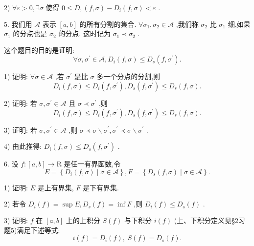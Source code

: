 2) $\forall \varepsilon  > 0,\exists \sigma$ 使得 $0 \leq  D,\left( {f,\sigma }\right)  - {D}_{i}\left( {f,\sigma }\right)  < \varepsilon$ .

5. 我们用 $\mathcal{A}$ 表示 $\left\lbrack  {a,b}\right\rbrack$ 的所有分割的集合. $\forall {\sigma }_{1},{\sigma }_{2} \in  \mathcal{A}$ ,我们称 ${\sigma }_{2}$ 比 ${\sigma }_{1}$ 细,如果 ${\sigma }_{1}$ 的分点也是 ${\sigma }_{2}$ 的分点. 这时记为 ${\sigma }_{1} \prec  {\sigma }_{2}$ .

这个题目的目的是证明:
$$\forall \sigma ,{\sigma }^{\prime } \in  \mathcal{A},{D}_{i}\left( {f,\sigma }\right)  \leq  {D}_{s}\left( {f,{\sigma }^{\prime }}\right) .$$

1) 证明: $\forall \sigma  \in  \mathcal{A}$ ,若 ${\sigma }^{\prime }$ 是比 $\sigma$ 多一个分点的分割,则
$${D}_{i}\left( {f,\sigma }\right)  \leq  {D}_{i}\left( {f,{\sigma }^{\prime }}\right) ,{D}_{s}\left( {f,{\sigma }^{\prime }}\right)  \leq  {D}_{s}\left( {f,\sigma }\right) .$$

2) 证明: 若 $\sigma ,{\sigma }^{\prime } \in  \mathcal{A}$ 且 $\sigma  \prec  {\sigma }^{\prime }$ ,则
$${D}_{i}\left( {f,\sigma }\right)  \leq  {D}_{i}\left( {f,{\sigma }^{\prime }}\right) ,{D}_{s}\left( {f,{\sigma }^{\prime }}\right)  \leq  {D}_{s}\left( {f,\sigma }\right) .$$

3) 证明: 若 $\sigma ,{\sigma }^{\prime } \in  \mathcal{A}$ ,则 $\sigma  \prec  \sigma  \smallsetminus  {\sigma }^{\prime },{\sigma }^{\prime } \prec  \sigma  \smallsetminus  {\sigma }^{\prime }$ .

4) 由此推得: ${D}_{i}\left( {f,\sigma }\right)  \leq  {D}_{s}\left( {f,{\sigma }^{\prime }}\right)$ .

6. 设 $f : \left\lbrack  {a,b}\right\rbrack   \rightarrow  \mathrm{R}$ 是任一有界函数,令
$$E = \left\{  {{D}_{i}\left( {f,\sigma }\right)  \mid  \sigma  \in  \mathcal{A}}\right\}  ,F = \left\{  {{D}_{s}\left( {f,\sigma }\right)  \mid  \sigma  \in  \mathcal{A}}\right\}  .$$

1) 证明: $E$ 是上有界集, $F$ 是下有界集.

2) 若令 ${D}_{i}\left( f\right)  = \sup E,{D}_{s}\left( f\right)  = \inf F$ ,则 ${D}_{i}\left( f\right)  \leq  {D}_{s}\left( f\right)$ .

3) 证明: $f$ 在 $\left\lbrack  {a,b}\right\rbrack$ 上的上积分 $S\left( f\right)$ 与下积分 $i\left( f\right)$ (上、下积分定义见§2习题5)满足下述等式:
$$i\left( f\right)  = {D}_{i}\left( f\right) ,\;S\left( f\right)  = {D}_{s}\left( f\right) .$$

